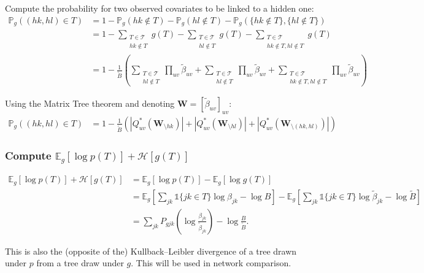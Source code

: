 \documentclass[11pt,a4paper]{article}
\newcommand{\Esp}{\mathds{E}}
\newcommand{\entr}{\mathcal{H}}
\begin{document}
Compute the probability for two observed covariates to be linked to a hidden one:
\begin{align*}
\mathds{P}_g((hk,hl)\in T)&= 1 - \mathds{P}_g(hk \notin T)- \mathds{P}_g(hl \notin T) - \mathds{P}_g( \{hk \notin T\}, \{hl \notin T\})\\
&=1-\sum_{\substack{T \in \mathcal{T}\\ hk \notin T}} g(T)-\sum_{\substack{T \in \mathcal{T}\\ hl \notin T}} g(T)-\sum_{\substack{T \in \mathcal{T}\\ hk \notin T, hl \notin T}} g(T)\\
&= 1- \frac{1}{\widetilde{B}} \left( \sum_{\substack{T \in \mathcal{T}\\ hl \notin T}} \prod_{uv} \widetilde{\beta}_{uv} +\sum_{\substack{T \in \mathcal{T}\\ hl \notin T}}\prod_{uv} \widetilde{\beta}_{uv} +\sum_{\substack{T \in \mathcal{T}\\ hk \notin T, hl \notin T}}\prod_{uv} \widetilde{\beta}_{uv} \right)
\end{align*}

Using the Matrix Tree theorem and denoting $\bm{W} = [\widetilde{\beta}_{uv}]_{uv}$:
\begin{align*}
\mathds{P}_g((hk,hl)\in T)&= 1-\frac{1}{\widetilde{B}} \left(  |Q_{uv}^*(\bm{W}_{\setminus hk})|+|Q_{uv}^*(\bm{W}_{\setminus hl})|+|Q_{uv}^*(\bm{W}_{\setminus (hk,hl)})| \right) 
\end{align*}
\subsubsection{Compute $\Esp_g[\log p(T)] + \entr[g(T)]$}

\begin{align*}
\Esp_g[\log p(T)] + \entr[g(T)]&=\Esp_g[\log p(T)] -\Esp_g[\log g(T)]\\
&=\Esp_g\left[ \sum_{jk} \mathds{1}\{jk \in T\} \log \beta_{jk} - \log B\right] - \Esp_g\left[\sum_{jk} \mathds{1}\{jk \in T\} \log \widetilde{\beta}_{jk} - \log \widetilde{B}\right]\\
&= \sum_{jk}P_{gjk} \left(\log \frac{\beta_{jk}}{\widetilde{\beta}_{jk}}\right) - \log \frac{B}{\widetilde{B}} 
.\end{align*}

This is also the (opposite of the) Kullback–Leibler divergence of a tree drawn under $p$ from a tree draw under $g$. This will be used in network comparison.
\end{document}
